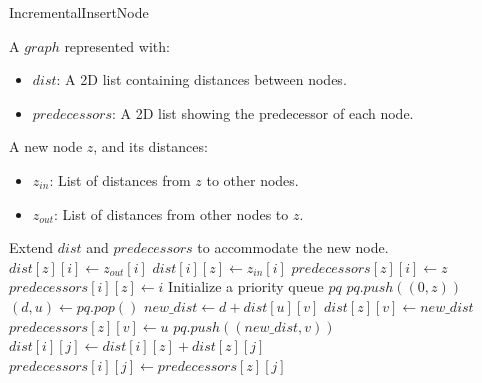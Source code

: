 \documentclass[conference]{IEEEtran}
\begin{document}







\appendix
\begin{algorithm}[H]
\caption{IncrementalInsertNode}
\begin{algorithmic}[1]
\Require A $graph$ represented with:
\begin{itemize}
    \item $dist$: A 2D list containing distances between nodes.
    \item $predecessors$: A 2D list showing the predecessor of each node.
\end{itemize}
\Require A new node $z$, and its distances:
\begin{itemize}
    \item $z_{in}$: List of distances from $z$ to other nodes.
    \item $z_{out}$: List of distances from other nodes to $z$.
\end{itemize}
\State Extend $dist$ and $predecessors$ to accommodate the new node.
    \State $dist[z][i] \leftarrow z_{out}[i]$
    \State $dist[i][z] \leftarrow z_{in}[i]$
        \State $predecessors[z][i] \leftarrow z$
    \EndIf
        \State $predecessors[i][z] \leftarrow i$
    \EndIf
\EndFor
\State Initialize a priority queue $pq$
\State $pq.push((0, z))$
    \State $(d, u) \leftarrow pq.pop()$
            \State $new\_dist \leftarrow d + dist[u][v]$
                \State $dist[z][v] \leftarrow new\_dist$
                \State $predecessors[z][v] \leftarrow u$
                \State $pq.push((new\_dist, v))$
            \EndIf
        \EndIf
    \EndFor
                \State $dist[i][j] \leftarrow dist[i][z] + dist[z][j]$
                \State $predecessors[i][j] \leftarrow predecessors[z][j]$
            \EndIf
        \EndFor
    \EndFor
\EndWhile
\end{algorithmic}
\end{algorithm}
\end{document}
